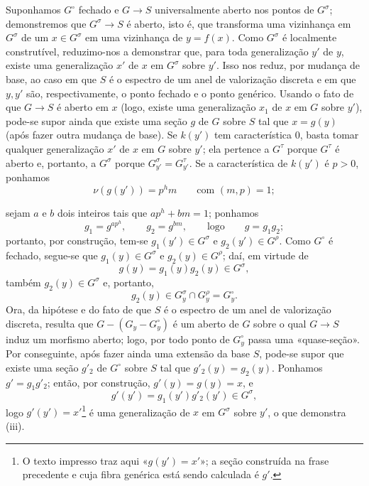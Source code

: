 \documentclass[11pt,twoside,openany]{book}
\numberwithin{equation}{section}
\newcommand{\src}[1]{%
  \phantomsection\hypertarget{src:#1}{}%
  \marginpar{\raggedleft\footnotesize\sffamily #1}%
}
\theoremstyle{plain}
\theoremstyle{definition}
\theoremstyle{remark}
\newcommand{\FgaUnitKey}{frontmatter}
\renewcommand{\src}[1]{%
  \phantomsection\hypertarget{src:\FgaUnitKey:#1}{}%
  \marginpar{\raggedleft\footnotesize\sffamily #1}%
}
\begin{document}
Suponhamos $G^\circ$ fechado e $G\longrightarrow S$ universalmente aberto nos
pontos de $G^\sigma$; demonstremos que $G^\sigma\longrightarrow S$ é aberto,
isto é, que transforma uma vizinhança em $G^\sigma$ de um $x\in G^\sigma$
em uma vizinhança de $y=f(x)$. Como $G^\sigma$ é localmente construtível,
reduzimo-nos a demonstrar que, para toda generalização $y'$ de $y$, existe uma
generalização $x'$ de $x$ em $G^\sigma$ sobre $y'$. Isso nos reduz, por
mudança de base, ao caso em que $S$ é o espectro de um anel de valorização
discreta e em que $y,y'$ são, respectivamente, o ponto fechado e o ponto
genérico. Usando o fato de que $G\longrightarrow S$ é aberto em $x$ (logo,
existe uma generalização $x_1$ de $x$ em $G$ sobre $y'$), pode-se supor ainda
que existe uma seção $g$ de $G$ sobre $S$ tal que $x=g(y)$ (após fazer outra
mudança de base). Se $k(y')$ tem característica 0, basta tomar qualquer
generalização $x'$ de $x$ em $G$ sobre $y'$; ela pertence a $G^\tau$ porque
$G^\tau$ é aberto e, portanto, a $G^\sigma$ porque
$G_{y'}^\sigma=G_{y'}^\tau$. Se a característica de $k(y')$ é $p>0$,
ponhamos
\[
\nu(g(y'))=p^hm\qquad\text{com }(m,p)=1 ;
\]
\src{227}
sejam $a$ e $b$ dois inteiros tais que $ap^h+bm=1$; ponhamos
\[
g_1=g^{ap^h},\qquad g_2=g^{bm},\qquad\text{logo}\qquad g=g_1g_2 ;
\]
portanto, por construção, tem-se $g_1(y')\in G^\sigma$ e
$g_2(y')\in G^\rho$. Como $G^\circ$ é fechado, segue-se que
$g_1(y)\in G^\sigma$ e $g_2(y)\in G^\rho$; daí, em virtude de
\[
g(y)=g_1(y)g_2(y)\in G^\sigma,
\]
também $g_2(y)\in G^\sigma$ e, portanto,
\[
g_2(y)\in G_y^\sigma\cap G_y^\rho=G_y^\circ.
\]
Ora, da hipótese e do fato de que $S$ é o espectro de um anel de valorização
discreta, resulta que $G-(G_y-G_y^\circ)$ é um aberto de $G$ sobre o qual
$G\longrightarrow S$ induz um morfismo aberto; logo, por todo ponto de
$G_y^\circ$ passa uma «quase-seção». Por conseguinte, após fazer ainda uma
extensão da base $S$, pode-se supor que existe uma seção $g'_2$ de $G^\circ$
sobre $S$ tal que $g'_2(y)=g_2(y)$. Ponhamos $g'=g_1g'_2$; então, por
construção, $g'(y)=g(y)=x$, e
\[
g'(y')=g_1(y')g'_2(y')\in G^\sigma,
\]
logo $g'(y')=x'$\footnote{O texto impresso traz aqui «$g(y')=x'$»; a seção
construída na frase precedente e cuja fibra genérica está sendo calculada é
$g'$.} é uma generalização de $x$ em $G^\sigma$ sobre $y'$, o que demonstra
(iii).
\end{document}
